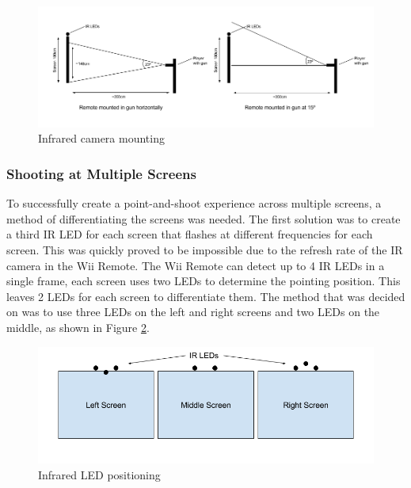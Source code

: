\documentclass[a4paper,11pt]{article}
\begin{document}
\begin{figure}
	\centering
	\includegraphics[scale=0.5]{ir}
    \caption{Infrared camera mounting}
    \label{fig:ir_mounting}
\end{figure}

\subsubsection{Shooting at Multiple Screens}
To successfully create a point-and-shoot experience across multiple screens, a method of differentiating the screens was needed. The first solution was to create a third IR LED for each screen that flashes at different frequencies for each screen. This was quickly proved to be impossible due to the refresh rate of the IR camera in the Wii Remote. The Wii Remote can detect up to 4 IR LEDs in a single frame, each screen uses two LEDs to determine the pointing position. This leaves 2 LEDs for each screen to differentiate them. The method that was decided on was to use three LEDs on the left and right screens and two LEDs on the middle, as shown in Figure \ref{fig:led_pos}. 

\begin{figure}
	\centering
	\includegraphics[scale=0.5]{led_pos}
    \caption{Infrared LED positioning}
    \label{fig:led_pos}
\end{figure}
\end{document}
